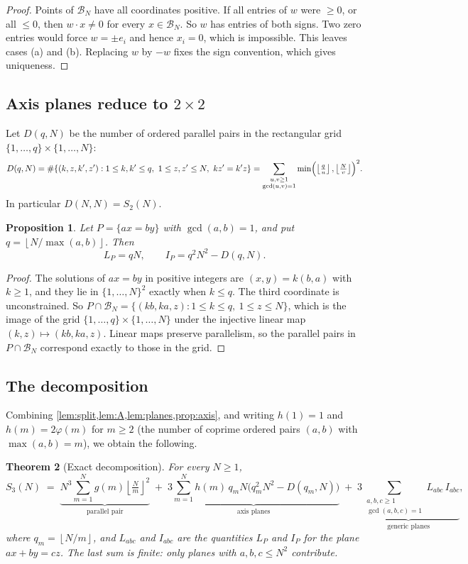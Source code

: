 \documentclass[11pt]{article}
\newtheorem{theorem}{Theorem}[section]
\newtheorem{proposition}[theorem]{Proposition}
\theoremstyle{definition}
\newcommand{\BN}{\mathcal{B}_N}
\newcommand{\floor}[1]{\left\lfloor #1 \right\rfloor}
\begin{document}
\begin{proof}
Points of $\BN$ have all coordinates positive. If all entries of $w$ were $\ge0$, or all $\le0$, then $w\cdot x\neq 0$ for every $x\in\BN$. So $w$ has entries of both signs. Two zero entries would force $w=\pm e_i$ and hence $x_i=0$, which is impossible. This leaves cases (a) and (b). Replacing $w$ by $-w$ fixes the sign convention, which gives uniqueness.
\end{proof}

\subsection{Axis planes reduce to \texorpdfstring{$2\times2$}{2x2}}

Let $D(q,N)$ be the number of ordered parallel pairs in the rectangular grid $\{1,\dots,q\}\times\{1,\dots,N\}$:
\[
D(q,N)=\#\{(k,z,k',z'):1\le k,k'\le q,\ 1\le z,z'\le N,\ kz'=k'z\}=\sum_{\substack{u,v\ge1\\ \gcd(u,v)=1}}\min\Bigl(\floor{\tfrac qu},\floor{\tfrac Nv}\Bigr)^{2}.
\]
In particular $D(N,N)=S_2(N)$.

\begin{proposition}\label{prop:axis}
Let $P=\{ax=by\}$ with $\gcd(a,b)=1$, and put $q=\floor{N/\max(a,b)}$. Then
\[
L_P=qN,\qquad I_P=q^2N^2-D(q,N).
\]
\end{proposition}

\begin{proof}
The solutions of $ax=by$ in positive integers are $(x,y)=k(b,a)$ with $k\ge1$, and they lie in $\{1,\dots,N\}^2$ exactly when $k\le q$. The third coordinate is unconstrained. So $P\cap\BN=\{(kb,ka,z):1\le k\le q,\ 1\le z\le N\}$, which is the image of the grid $\{1,\dots,q\}\times\{1,\dots,N\}$ under the injective linear map $(k,z)\mapsto(kb,ka,z)$. Linear maps preserve parallelism, so the parallel pairs in $P\cap\BN$ correspond exactly to those in the grid.
\end{proof}

\subsection{The decomposition}

Combining \cref{lem:split,lem:A,lem:planes,prop:axis}, and writing $h(1)=1$ and $h(m)=2\varphi(m)$ for $m\ge2$ (the number of coprime ordered pairs $(a,b)$ with $\max(a,b)=m$), we obtain the following.

\begin{theorem}[Exact decomposition]\label{thm:decomp}
For every $N\ge1$,
\[
S_3(N)\;=\;\underbrace{N^3\sum_{m=1}^{N}g(m)\floor{\tfrac Nm}^2}_{\text{parallel pair}}
\;+\;\underbrace{3\sum_{m=1}^{N}h(m)\,q_mN\bigl(q_m^2N^2-D(q_m,N)\bigr)}_{\text{axis planes}}
\;+\;\underbrace{3\!\!\sum_{\substack{a,b,c\ge1\\ \gcd(a,b,c)=1}}\!\! L_{abc}\,I_{abc}}_{\text{generic planes}},
\]
where $q_m=\floor{N/m}$, and $L_{abc}$ and $I_{abc}$ are the quantities $L_P$ and $I_P$ for the plane $ax+by=cz$. The last sum is finite: only planes with $a,b,c\le N^2$ contribute.
\end{theorem}
\end{document}
